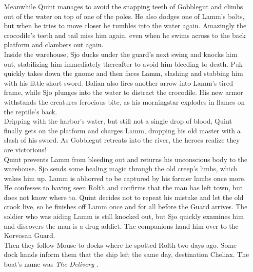 Meanwhile Quint manages to avoid the snapping teeth of Gobblegut and climbs out of the water on top of one of the poles. He also dodges one of Lamm's bolts, but when he tries to move closer he tumbles into the water again. Amazingly the crocodile's teeth and tail miss him again, even when he swims across to the back platform and clambers out again.\\

Inside the warehouse, Sjo ducks under the guard's next swing and knocks him out, stabilizing him immediately thereafter to avoid him bleeding to death. Puk quickly takes down the gnome and then faces Lamm, slashing and stabbing him with his little short sword. Balian also fires another arrow into Lamm's tired frame, while Sjo plunges into the water to distract the crocodile. His new armor withstands the creatures ferocious bite, as his morningstar explodes in flames on the reptile's back.\\

Dripping with the harbor's water, but still not a single drop of blood, Quint finally gets on the platform and charges Lamm, dropping his old master with a slash of his sword. As Gobblegut retreats into the river, the heroes realize they are victorious!\\

Quint prevents Lamm from bleeding out and returns his unconscious body to the warehouse. Sjo sends some healing magic through the old creep's limbs, which wakes him up. Lamm is abhorred to be captured by his former lambs once more. He confesses to having seen Rolth and confirms that the man has left town, but does not know where to. Quint decides not to repeat his mistake and let the old crook live, so he finishes off Lamm once and for all before the Guard arrives. The soldier who was aiding Lamm is still knocked out, but Sjo quickly examines him and discovers the man is a drug addict. The companions hand him over to the Korvosan Guard.\\

Then they follow Mouse to docks where he spotted Rolth two days ago. Some dock hands inform them that the ship left the same day, destination Cheliax. The boat's name was {\itshape The Delivery} . 